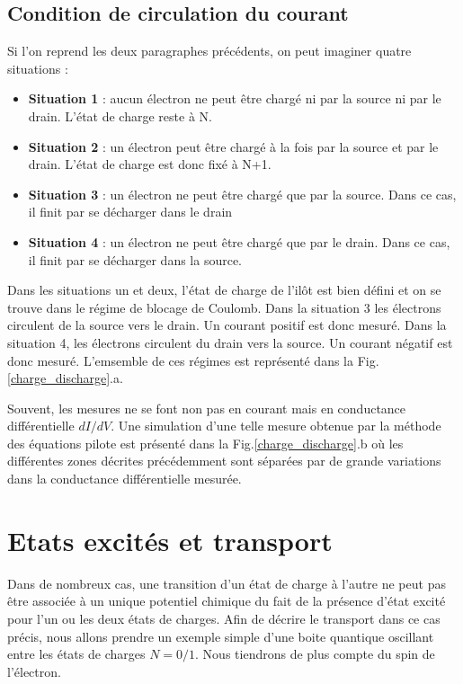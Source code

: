 \subsection{Condition de circulation du courant}

Si l'on reprend les deux paragraphes précédents, on peut imaginer quatre situations :
\begin{itemize}
\item \textbf{Situation 1} : aucun électron ne peut \^etre chargé ni par la source ni par le drain. L'état de charge reste à N.
\item \textbf{Situation 2} : un électron peut \^etre chargé à la fois par la source et par le drain. L'état de charge est donc fixé à N+1.
\item \textbf{Situation 3} : un électron ne peut \^etre chargé que par la source. Dans ce cas, il finit par se décharger dans le drain
\item \textbf{Situation 4} : un électron ne peut \^etre chargé que par le drain. Dans ce cas, il finit par se décharger dans la source. \newline
\end{itemize}

Dans les situations un et deux, l'état de charge de l'il\^ot est bien défini et on se trouve dans le régime de blocage de Coulomb. Dans la situation 3 les électrons circulent de la source vers le drain. Un courant positif est donc mesuré. Dans la situation 4, les électrons circulent du drain vers la source. Un courant négatif est donc mesuré. L'emsemble de ces régimes est représenté dans la Fig. \ref{charge_discharge}.a. 

Souvent, les mesures ne se font non pas en courant mais en conductance différentielle $dI/dV$. Une simulation d'une telle mesure obtenue par la méthode des équations pilote est présenté dans la  Fig.\ref{charge_discharge}.b où les différentes zones décrites précédemment sont séparées par de grande variations dans la conductance différentielle mesurée.
\section{Etats excités et transport}

Dans de nombreux cas, une transition d'un état de charge à l'autre ne peut pas être associée à un unique potentiel chimique du fait de la présence d'état excité pour l'un ou les deux états de charges. Afin de décrire le transport dans ce cas précis, nous allons prendre un exemple simple d'une boite quantique oscillant entre les états de charges $N=0/1$. Nous tiendrons de plus compte du spin de l'électron. 

